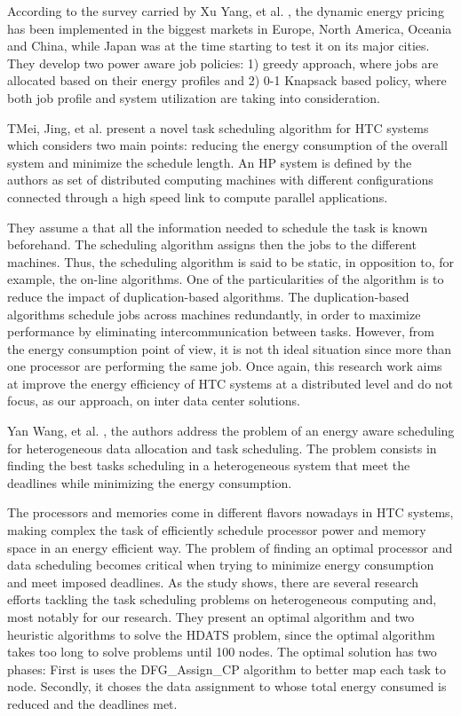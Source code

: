 According to the survey carried by Xu Yang, et al. \cite{DYN_PRICING_HPC}, the dynamic energy
pricing has been implemented in the biggest markets in Europe, North America,
Oceania and China, while Japan was at the time starting to test it on its major
cities. They develop two power aware job policies: 1) greedy approach, where jobs are
allocated based on their energy profiles  and 2) 0-1 Knapsack based policy,
where both job profile and system utilization are taking into consideration.

TMei, Jing, et al. \cite{SCHED_HETEROGE} present a novel task scheduling algorithm
for HTC systems which considers two main points: reducing the energy consumption
of the overall system and minimize the schedule length. An HP system is defined
by the authors as set of distributed computing machines with different
configurations connected through a high speed link to compute parallel
applications.

They assume a that all the information needed to schedule the task is known
beforehand. The scheduling algorithm assigns then the jobs to the different
machines. Thus, the scheduling algorithm is said to be static, in opposition to,
for example, the on-line algorithms.  One of the particularities of the algorithm is to reduce the impact of
duplication-based algorithms. The duplication-based algorithms schedule jobs
across machines redundantly, in order to maximize performance by eliminating
intercommunication between tasks. However, from the energy consumption point of
view, it is not th ideal situation since more than one processor are performing
the same job. Once again, this research work aims at improve the energy efficiency of HTC
systems at a distributed level and do not focus, as our approach, on inter data
center solutions.

 Yan Wang, et al. \cite{TASK_SCHED}, the authors address the problem of an energy aware
scheduling for heterogeneous data allocation and task scheduling. The problem
consists in finding the best tasks scheduling in a heterogeneous system that meet
the deadlines while minimizing the energy consumption.

The processors and memories come in different flavors nowadays in HTC
systems, making complex the task of efficiently schedule processor power and 
memory space in an energy efficient way. The problem of finding an optimal
processor and data scheduling becomes critical when trying to minimize energy 
consumption and meet imposed deadlines. As the study shows, there are several research efforts tackling the task
scheduling problems on heterogeneous computing and, most notably for our
research. They present an optimal algorithm and two heuristic algorithms to solve the
HDATS problem, since the optimal algorithm takes too long to solve problems
until 100 nodes. The optimal solution has two phases: First is uses the
DFG\_Assign\_CP algorithm to better map each task to node. Secondly, it choses the
data assignment to whose total energy consumed is reduced and the deadlines met.

